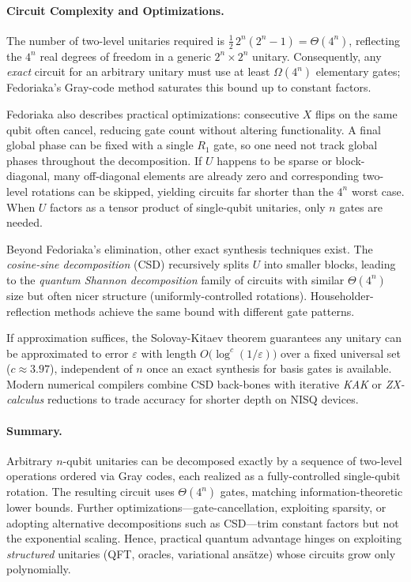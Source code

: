 \paragraph{Circuit Complexity and Optimizations.} 
The number of two-level unitaries required is $\tfrac12\,2^{n}(2^{n}-1)=\Theta(4^{n})$, reflecting the $4^{n}$ real degrees of freedom in a generic $2^{n}\times2^{n}$ unitary.\cite{Shende2006synthesis} Consequently, any \emph{exact} circuit for an arbitrary unitary must use at least $\Omega(4^{n})$ elementary gates; Fedoriaka's Gray-code method saturates this bound up to constant factors.\cite{fedoriaka2025decomposition}

Fedoriaka also describes practical optimizations: consecutive $X$ flips on the same qubit often cancel, reducing gate count without altering functionality.\cite{fedoriaka2025decomposition} A final global phase can be fixed with a single $R_1$ gate, so one need not track global phases throughout the decomposition.\cite{Reck1994optics} 
If $U$ happens to be sparse or block-diagonal, many off-diagonal elements are already zero and corresponding two-level rotations can be skipped, yielding circuits far shorter than the $4^{n}$ worst case.\cite{Bullock2004gray} When $U$ factors as a tensor product of single-qubit unitaries, only $n$ gates are needed.\cite{Barenco1995elementary}

Beyond Fedoriaka's elimination, other exact synthesis techniques exist. The \emph{cosine-sine decomposition} (CSD) recursively splits $U$ into smaller blocks, leading to the \emph{quantum Shannon decomposition} family of circuits with similar $\Theta(4^{n})$ size but often nicer structure (uniformly-controlled rotations).\cite{Miller2006csd} Householder-reflection methods achieve the same bound with different gate patterns.\cite{Shende2006synthesis}

If approximation suffices, the Solovay-Kitaev theorem guarantees any unitary can be approximated to error $\varepsilon$ with length $O\bigl(\log^{c}(1/\varepsilon)\bigr)$ over a fixed universal set ($c\approx3.97$), independent of $n$ once an exact synthesis for basis gates is available.\cite{Dawson2005solovay} Modern numerical compilers combine CSD back-bones with iterative \emph{KAK} or \emph{ZX-calculus} reductions to trade accuracy for shorter depth on NISQ devices.\cite{Heyfron2018zx}

\paragraph{Summary.} 
Arbitrary $n$-qubit unitaries can be decomposed exactly by a sequence of two-level operations ordered via Gray codes, each realized as a fully-controlled single-qubit rotation.\cite{fedoriaka2025decomposition} The resulting circuit uses $\Theta(4^{n})$ gates, matching information-theoretic lower bounds.\cite{Shende2006synthesis} Further optimizations—gate-cancellation, exploiting sparsity, or adopting alternative decompositions such as CSD—trim constant factors but not the exponential scaling. Hence, practical quantum advantage hinges on exploiting \emph{structured} unitaries (QFT, oracles, variational ansätze) whose circuits grow only polynomially.\cite{Preskill2018nisq}
